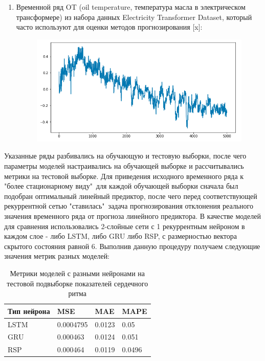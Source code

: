\documentclass[11pt]{article}
\begin{document}
\begin{enumerate}
\begin{figure}[H]
\label{}
\end{figure}
  \item Временной ряд OT (oil temperature, температура масла в электрическом трансформере) из набора данных Electricity Transformer Dataset, который часто используют для оценки методов прогнозирования [x]:
\begin{figure}[H]
\centering
\includegraphics[scale=0.5]{etth_ot_time_series.png}
\label{}
\end{figure}
\end{enumerate}

Указанные ряды разбивались на обучающую и тестовую выборки, после чего параметры моделей настраивались на обучающей выборке и рассчитывались метрики на тестовой выборке.
Для приведения исходного временного ряда к "более стационарному виду"\ для каждой обучающей выборки сначала был подобран оптимальный линейный предиктор, после чего перед соответствующей рекуррентной сетью "ставилась"\ задача прогнозирования отклонения реального значения временного ряда от прогноза линейного предиктора.  
В качестве моделей для сравнения использовались 2-слойные сети с 1 рекуррентным нейроном в каждом слое - либо LSTM, либо GRU либо RSP, с размерностью вектора скрытого состояния равной 6.
Выполнив данную процедуру получаем следующие значения метрик разных моделей:


\begin{table}[H]
\caption{Метрики моделей с разными нейронами на тестовой подвыборке показателей сердечного ритма}
\begin{tabular}{ |p{3cm}|p{3cm}|p{3cm}|p{3cm}|  }
 \hline
  Тип нейрона & MSE &  MAE & MAPE \\
 \hline
 LSTM & 0.0004795 & 0.0123 & 0.05 \\
 \hline
 GRU & 0.000463 & 0.0124 & 0.051 \\
 \hline 
 RSP & 0.000464 & 0.0119 & 0.0496 \\
 \hline
\end{tabular}
\end{table}
\end{document}
